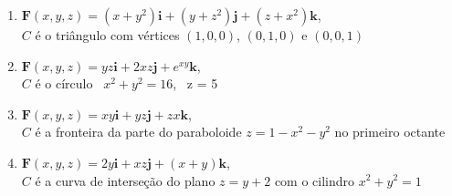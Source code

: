 \documentclass[a4paper, 12pt]{article}
\begin{document}
	\begin{enumerate}[resume]
	
		\item $\textbf{F}(x,y,z) =  (x + y^2)\textbf{i} + (y + z^2)\textbf{j} + (z + x^2)\textbf{k}$, \\ $C$ é o triângulo com vértices $(1,0,0)$, $(0,1,0)$ e $(0,0,1)$

		\item $\textbf{F}(x,y,z) =  yz\textbf{i} + 2xz\textbf{j} + e^{xy}\textbf{k}$, \\ $C$ é o círculo \, $x^2 + y^2 = 16$, \, z = 5
		\resposta{\fazer}

		\item $\textbf{F}(x,y,z) =  xy\textbf{i} + yz\textbf{j} + zx\textbf{k}$, \\ $C$ é a fronteira da parte do paraboloide $z = 1 - x^2 - y^2$ no primeiro octante

		\item $\textbf{F}(x,y,z) =  2y\textbf{i} + xz\textbf{j} + (x + y)\textbf{k}$, \\ $C$ é a curva de interseção do plano $z = y + 2$ com o cilindro $x^2 + y^2 = 1$
		\resposta{$\pi$}
	
	\end{enumerate}
		
	\vspace{5mm}	
	
\end{document}

